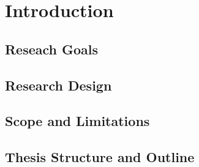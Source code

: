 \chapter{Introduction\label{cha:intro}}

\section{Reseach Goals}

\section{Research Design}

\section{Scope and Limitations}

\section{Thesis Structure and Outline}